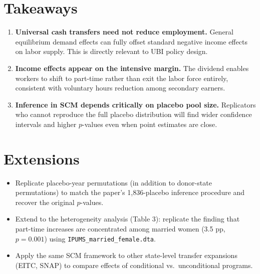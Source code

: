 \documentclass[12pt]{article}
\begin{document}
\section{Takeaways}

\begin{enumerate}
  \item \textbf{Universal cash transfers need not reduce employment.} General equilibrium demand effects can fully offset standard negative income effects on labor supply. This is directly relevant to UBI policy design.
  \item \textbf{Income effects appear on the intensive margin.} The dividend enables workers to shift to part-time rather than exit the labor force entirely, consistent with voluntary hours reduction among secondary earners.
  \item \textbf{Inference in SCM depends critically on placebo pool size.} Replicators who cannot reproduce the full placebo distribution will find wider confidence intervals and higher $p$-values even when point estimates are close.
\end{enumerate}

\section{Extensions}

\begin{itemize}
  \item Replicate placebo-year permutations (in addition to donor-state permutations) to match the paper's 1,836-placebo inference procedure and recover the original $p$-values.
  \item Extend to the heterogeneity analysis (Table 3): replicate the finding that part-time increases are concentrated among married women (3.5 pp, $p = 0.001$) using \texttt{IPUMS\_married\_female.dta}.
  \item Apply the same SCM framework to other state-level transfer expansions (EITC, SNAP) to compare effects of conditional vs.\ unconditional programs.
\end{itemize}



\end{document}
